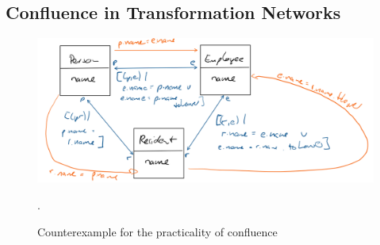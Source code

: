 


\subsection{Confluence in Transformation Networks}

\begin{figure}
    \centering
    \includegraphics[width=\textwidth]{figures/correctness/orchestration/confluence.png}
    \caption[Confluence of transformations]{Counterexample for the practicality of confluence}.
    \label{fig:orchestration:confluence}
\end{figure}

